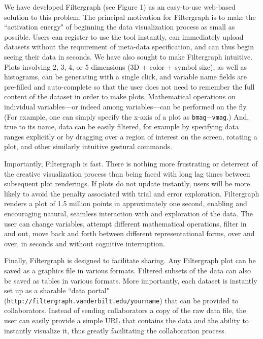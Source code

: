 We have developed Filtergraph (see Figure 1) as an easy-to-use web-based solution to this problem. The principal motivation for Filtergraph is to make the ``activation energy" of beginning the data visualization process as small as possible. Users can register to use the tool instantly, can immediately upload datasets without the requirement of meta-data specification, and can thus begin seeing their data in seconds. We have also sought to make Filtergraph intuitive. Plots involving 2, 3, 4, or 5 dimensions (3D + color + symbol size), as well as histograms, can be generating with a single click, and variable name fields are pre-filled and auto-complete so that the user does not need to remember the full content of the dataset in order to make plots. Mathematical operations on individual variables---or indeed among variables---can be performed on the fly. (For example, one can simply specify the x-axis of a plot as {\tt bmag}$-${\tt vmag}.) And, true to its name, data can be easily filtered, for example by specifying data ranges explicitly or by dragging over a region of interest on the screen, rotating a plot, and other similarly intuitive gestural commands.

Importantly, Filtergraph is fast. There is nothing more frustrating or deterrent of the creative visualization process than being faced with long lag times between subsequent plot renderings. If plots do not update instantly, users will be more likely to avoid the penalty associated with trial and error exploration. Filtergraph renders a plot of 1.5 million points in approximately one second, enabling and encouraging natural, seamless interaction with and exploration of the data. The user can change variables, attempt different mathematical operations, filter in and out, move back and forth between different representational forms, over and over, in seconds and without cognitive interruption.

Finally, Filtergraph is designed to facilitate sharing. Any Filtergraph plot can be saved as a graphics file in various formats. Filtered subsets of the data can also be saved as tables in various formats. More importantly, each dataset is instantly set up as a sharable ``data portal" ({\tt http://filtergraph.vanderbilt.edu/yourname}) that can be provided to collaborators. Instead of sending collaborators a copy of the raw data file, the user can easily provide a simple URL that contains the data and the ability to instantly visualize it, thus greatly facilitating the collaboration process.

